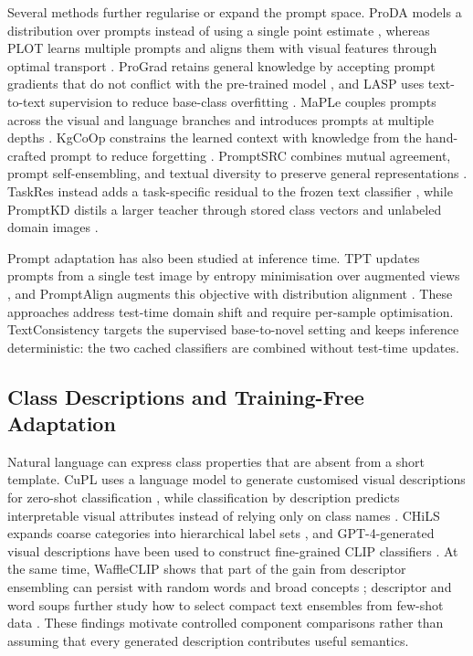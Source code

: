 \documentclass[preprint,12pt]{elsarticle}
\begin{document}
Several methods further regularise or expand the prompt space. ProDA models a distribution over prompts instead of using a single point estimate \cite{lu2022proda}, whereas PLOT learns multiple prompts and aligns them with visual features through optimal transport \cite{chen2023plot}. ProGrad retains general knowledge by accepting prompt gradients that do not conflict with the pre-trained model \cite{zhu2023prograd}, and LASP uses text-to-text supervision to reduce base-class overfitting \cite{bulat2023lasp}. MaPLe couples prompts across the visual and language branches and introduces prompts at multiple depths \cite{khattak2023maple}. KgCoOp constrains the learned context with knowledge from the hand-crafted prompt to reduce forgetting \cite{yao2023kgcoop}. PromptSRC combines mutual agreement, prompt self-ensembling, and textual diversity to preserve general representations \cite{khattak2023promptsrc}. TaskRes instead adds a task-specific residual to the frozen text classifier \cite{yu2023taskres}, while PromptKD distils a larger teacher through stored class vectors and unlabeled domain images \cite{li2024promptkd}.

Prompt adaptation has also been studied at inference time. TPT updates prompts from a single test image by entropy minimisation over augmented views \cite{shu2022tpt}, and PromptAlign augments this objective with distribution alignment \cite{samadh2023promptalign}. These approaches address test-time domain shift and require per-sample optimisation. TextConsistency targets the supervised base-to-novel setting and keeps inference deterministic: the two cached classifiers are combined without test-time updates.

\subsection{Class Descriptions and Training-Free Adaptation}

Natural language can express class properties that are absent from a short template. CuPL uses a language model to generate customised visual descriptions for zero-shot classification \cite{pratt2023cupl}, while classification by description predicts interpretable visual attributes instead of relying only on class names \cite{menon2023descriptions}. CHiLS expands coarse categories into hierarchical label sets \cite{novack2023chils}, and GPT-4-generated visual descriptions have been used to construct fine-grained CLIP classifiers \cite{maniparambil2023gpt4clip}. At the same time, WaffleCLIP shows that part of the gain from descriptor ensembling can persist with random words and broad concepts \cite{roth2023waffleclip}; descriptor and word soups further study how to select compact text ensembles from few-shot data \cite{liao2024soups}. These findings motivate controlled component comparisons rather than assuming that every generated description contributes useful semantics.
\end{document}
